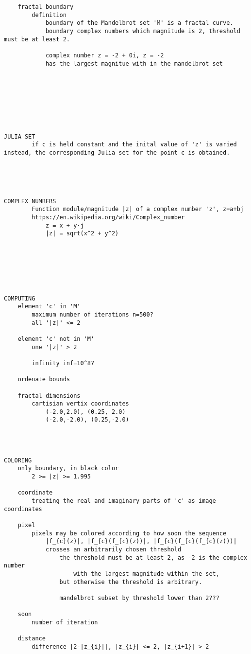 \begin{verbatim}
    fractal boundary
        definition 
            boundary of the Mandelbrot set 'M' is a fractal curve.
            boundary complex numbers which magnitude is 2, threshold must be at least 2.

            complex number z = -2 + 0i, z = -2
            has the largest magnitue with in the mandelbrot set








JULIA SET
        if c is held constant and the inital value of 'z' is varied instead, the corresponding Julia set for the point c is obtained.





COMPLEX NUMBERS
        Function module/magnitude |z| of a complex number 'z', z=a+bj
        https://en.wikipedia.org/wiki/Complex_number
            z = x + y·j
            |z| = sqrt(x^2 + y^2)







COMPUTING
    element 'c' in 'M'
        maximum number of iterations n=500?
        all '|z|' <= 2

    element 'c' not in 'M'
        one '|z|' > 2

        infinity inf=10^8?

    ordenate bounds
    
    fractal dimensions
        cartisian vertix coordinates 
            (-2.0,2.0), (0.25, 2.0)
            (-2.0,-2.0), (0.25,-2.0)




COLORING
    only boundary, in black color
        2 >= |z| >= 1.995
    
    coordinate
        treating the real and imaginary parts of 'c' as image coordinates

    pixel
        pixels may be colored according to how soon the sequence
            |f_{c}(z)|, |f_{c}(f_{c}(z))|, |f_{c}(f_{c}(f_{c}(z)))|
            crosses an arbitrarily chosen threshold
                the threshold must be at least 2, as -2 is the complex number 
                    with the largest magnitude within the set,
                but otherwise the threshold is arbitrary.

                mandelbrot subset by threshold lower than 2???

    soon
        number of iteration

    distance
        difference |2-|z_{i}||, |z_{i}| <= 2, |z_{i+1}| > 2







\end{verbatim}
